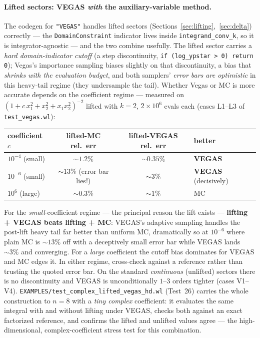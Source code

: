 \documentclass[11pt,a4paper]{article}
\begin{document}
\paragraph{Lifted sectors: VEGAS \emph{with} the auxiliary-variable method.}
The codegen for \texttt{"VEGAS"} handles lifted sectors
(Sections~\ref{sec:lifting},~\ref{sec:delta}) correctly --- the
\texttt{DomainConstraint} indicator lives inside \texttt{integrand\_conv\_k}, so
it is integrator-agnostic --- and the two combine usefully. The lifted sector
carries a \emph{hard domain-indicator cutoff} (a step discontinuity,
\texttt{if (log\_ypstar > 0) return 0}); Vegas's importance sampling biases
slightly on that discontinuity, a bias that \emph{shrinks with the evaluation
budget}, and both samplers' \emph{error bars are optimistic} in this heavy-tail
regime (they undersample the tail). Whether Vegas or MC is more accurate depends
on the coefficient regime --- measured on $(1+c\,x_1^2+x_2^2+x_1x_2^2)^{-2}$
lifted with $k{=}2$, $2{\times}10^6$ evals each (cases L1--L3 of
\texttt{test\_vegas.wl}):
\begin{center}\small
\begin{tabular}{lccl}
\toprule
coefficient $c$ & lifted-MC rel.\ err & lifted-VEGAS rel.\ err & better \\
\midrule
$10^{-4}$ (small) & $\sim1.2\%$ & $\sim0.35\%$ & \textbf{VEGAS} \\
$10^{-6}$ (small) & $\sim13\%$ (error bar lies!) & $\sim3\%$ & \textbf{VEGAS} (decisively) \\
$10^{6}$ (large) & $\sim0.3\%$ & $\sim1\%$ & MC \\
\bottomrule
\end{tabular}
\end{center}
For the \emph{small}-coefficient regime --- the principal reason the lift exists
--- \textbf{lifting + VEGAS beats lifting + MC}: VEGAS's adaptive sampling
handles the post-lift heavy tail far better than uniform MC, dramatically so at
$10^{-6}$ where plain MC is $\sim13\%$ off with a deceptively small error bar
while VEGAS lands $\sim3\%$ and converging. For a \emph{large} coefficient the
cutoff bias dominates for VEGAS and MC edges it. In either regime, cross-check
against a reference rather than trusting the quoted error bar. On the standard
\emph{continuous} (unlifted) sectors there is no discontinuity and VEGAS is
unconditionally $1$--$3$ orders tighter (cases V1--V4).
\texttt{EXAMPLES/test\_complex\_lifted\_vegas\_hd.wl} (Test~26) carries the whole
construction to $n=8$ with a \emph{tiny complex} coefficient: it evaluates the
same integral with and without lifting under VEGAS, checks both against an exact
factorized reference, and confirms the lifted and unlifted values agree --- the
high-dimensional, complex-coefficient stress test for this combination.
\end{document}

